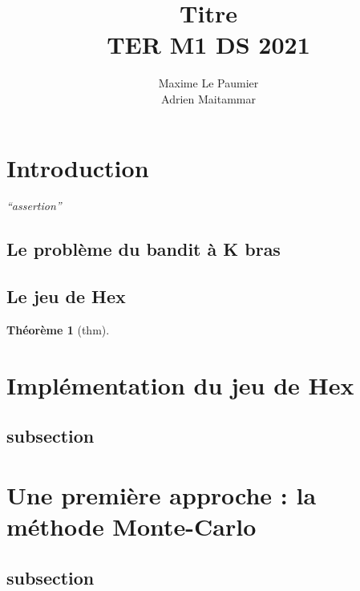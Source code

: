 \documentclass[a4paper]{article}
\title{\huge Titre\\[15pt] \small TER M1 DS 2021}
\author{Maxime Le Paumier \\ Adrien Maitammar}
\newtheorem{theorem}{Théorème}[subsection]
\theoremstyle{definition}
\begin{document}
\maketitle

\vspace{30pt}

\renewcommand{\contentsname}{Sommaire}
\tableofcontents
 \clearpage
 
 
\section{Introduction}

\vspace{5pt}

\textit{``assertion''}


\subsection{Le problème du bandit à K bras}

\subsection{Le jeu de Hex}


\begin{theorem}[thm]\label{thm}

\end{theorem}


\clearpage

\section{Implémentation du jeu de Hex}

\subsection{subsection}


\clearpage

\section{Une première approche : la méthode Monte-Carlo}

\subsection{subsection}
\end{document}
